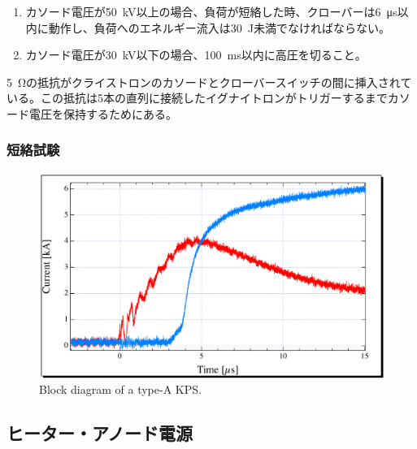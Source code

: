 \documentclass[book,openany]{jlreq}
\theoremstyle{definition}
\begin{document}
\begin{enumerate}
    \item カソード電圧が\SI{50}{\kilo\volt}以上の場合、負荷が短絡した時、クローバーは\SI{6}{\micro\second}以内に動作し、負荷へのエネルギー流入は\SI{30}{\joule}未満でなければならない。
    \item カソード電圧が\SI{30}{\kilo\volt}以下の場合、\SI{100}{\milli\second}以内に高圧を切ること。
\end{enumerate}

\SI{5}{\ohm}の抵抗がクライストロンのカソードとクローバースイッチの間に挿入されている。この抵抗は5本の直列に接続したイグナイトロンがトリガーするまでカソード電圧を保持するためにある。

\subsubsection{短絡試験}
\begin{figure}[!htt]
    \begin{center}
        \includegraphics[width=12cm,clip]{figs/sc_test.pdf}
        \caption{Block diagram of a type-A KPS.}
        \label{sctest}
    \end{center}
\end{figure}

\subsection{ヒーター・アノード電源}
\end{document}
